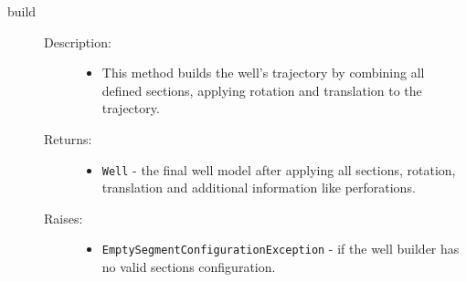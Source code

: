\begin{description}
		\item[ \colorbox{gray!20}{build}] \hfill
		\begin{description}
			\item[Description:] \hfill
			\begin{itemize}
				\item This method builds the well's trajectory by combining all defined sections, applying rotation and translation to the trajectory.
			\end{itemize}

			\item[Returns:] \hfill
			\begin{itemize}
				\item \texttt{Well} - the final well model after applying all sections, rotation, translation and additional information like perforations.
			\end{itemize}

			\item[Raises:] \hfill
			\begin{itemize}
				\item \texttt{EmptySegmentConfigurationException} - if the well builder has no valid sections configuration.
			\end{itemize}
		\end{description}

	\end{description}

